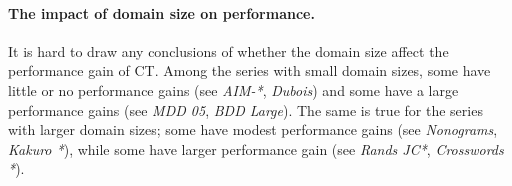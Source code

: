 \documentclass[a4paper,11pt]{article}
\numberwithin{equation}{section}
\begin{document}







\paragraph{The impact of domain size on performance.}
It is hard to draw any conclusions of whether the domain size affect
the performance gain of CT. Among the series with small domain sizes, some
have little or no performance gains (see \emph{AIM-*}, \emph{Dubois}) and
some have a large performance gains (see \emph{MDD 05}, \emph{BDD Large}).
The same is true for the series with larger domain sizes; some have
modest performance gains (see \emph{Nonograms}, \emph{Kakuro *}),
while some have larger performance gain (see \emph{Rands JC*}, \emph{Crosswords *}).

\end{document}

